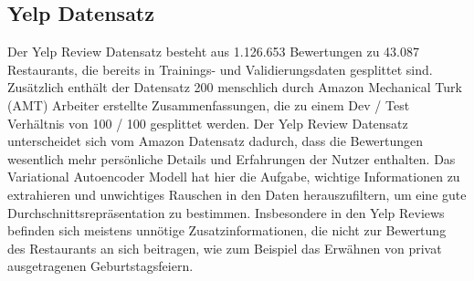 \subsection{Yelp Datensatz}
Der Yelp Review Datensatz \citep{pmlr-v97-chu19b} besteht aus 1.126.653 Bewertungen zu 43.087 Restaurants, die bereits in Trainings- und Validierungsdaten gesplittet sind. 
Zusätzlich enthält der Datensatz 200 menschlich durch Amazon Mechanical Turk (AMT) Arbeiter erstellte Zusammenfassungen, die zu einem Dev / Test Verhältnis von 100 / 100 gesplittet werden. 
Der Yelp Review Datensatz unterscheidet sich vom Amazon Datensatz dadurch, dass die Bewertungen wesentlich mehr persönliche Details und Erfahrungen der Nutzer enthalten.
Das Variational Autoencoder Modell hat hier die Aufgabe, wichtige Informationen zu extrahieren und unwichtiges Rauschen in den Daten herauszufiltern, um eine gute Durchschnittsrepräsentation zu bestimmen.
Insbesondere in den Yelp Reviews befinden sich meistens unnötige Zusatzinformationen, die nicht zur Bewertung des Restaurants an sich beitragen, wie zum Beispiel das Erwähnen von privat ausgetragenen Geburtstagsfeiern. 
\pagebreak
